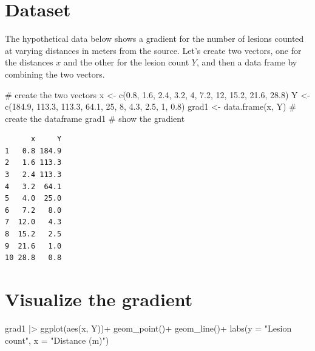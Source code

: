 \documentclass[
  letterpaper,
  DIV=11,
  numbers=noendperiod]{scrreprt}
\newenvironment{Shaded}{\begin{snugshade}}{\end{snugshade}}
\newcommand{\AttributeTok}[1]{\textcolor[rgb]{0.40,0.45,0.13}{#1}}
\newcommand{\CommentTok}[1]{\textcolor[rgb]{0.37,0.37,0.37}{#1}}
\newcommand{\DecValTok}[1]{\textcolor[rgb]{0.68,0.00,0.00}{#1}}
\newcommand{\FloatTok}[1]{\textcolor[rgb]{0.68,0.00,0.00}{#1}}
\newcommand{\FunctionTok}[1]{\textcolor[rgb]{0.28,0.35,0.67}{#1}}
\newcommand{\NormalTok}[1]{\textcolor[rgb]{0.00,0.23,0.31}{#1}}
\newcommand{\OtherTok}[1]{\textcolor[rgb]{0.00,0.23,0.31}{#1}}
\newcommand{\SpecialCharTok}[1]{\textcolor[rgb]{0.37,0.37,0.37}{#1}}
\newcommand{\StringTok}[1]{\textcolor[rgb]{0.13,0.47,0.30}{#1}}
\begin{document}
\hypertarget{dataset}{%
\section{Dataset}\label{dataset}}

The hypothetical data below shows a gradient for the number of lesions
counted at varying distances in meters from the source. Let's create two
vectors, one for the distances \(x\) and the other for the lesion count
\(Y\), and then a data frame by combining the two vectors.

\begin{Shaded}
\begin{Highlighting}[]
\CommentTok{\# create the two vectors}
\NormalTok{x }\OtherTok{\textless{}{-}} \FunctionTok{c}\NormalTok{(}\FloatTok{0.8}\NormalTok{, }\FloatTok{1.6}\NormalTok{, }\FloatTok{2.4}\NormalTok{, }\FloatTok{3.2}\NormalTok{, }\DecValTok{4}\NormalTok{, }\FloatTok{7.2}\NormalTok{, }\DecValTok{12}\NormalTok{, }\FloatTok{15.2}\NormalTok{, }\FloatTok{21.6}\NormalTok{, }\FloatTok{28.8}\NormalTok{)}
\NormalTok{Y }\OtherTok{\textless{}{-}} \FunctionTok{c}\NormalTok{(}\FloatTok{184.9}\NormalTok{, }\FloatTok{113.3}\NormalTok{, }\FloatTok{113.3}\NormalTok{, }\FloatTok{64.1}\NormalTok{, }\DecValTok{25}\NormalTok{, }\DecValTok{8}\NormalTok{, }\FloatTok{4.3}\NormalTok{, }\FloatTok{2.5}\NormalTok{, }\DecValTok{1}\NormalTok{, }\FloatTok{0.8}\NormalTok{)}
\NormalTok{grad1 }\OtherTok{\textless{}{-}} \FunctionTok{data.frame}\NormalTok{(x, Y) }\CommentTok{\# create the dataframe}
\NormalTok{grad1 }\CommentTok{\# show the gradient}
\end{Highlighting}
\end{Shaded}

\begin{verbatim}
      x     Y
1   0.8 184.9
2   1.6 113.3
3   2.4 113.3
4   3.2  64.1
5   4.0  25.0
6   7.2   8.0
7  12.0   4.3
8  15.2   2.5
9  21.6   1.0
10 28.8   0.8
\end{verbatim}

\hypertarget{visualize-the-gradient}{%
\section{Visualize the gradient}\label{visualize-the-gradient}}

\begin{Shaded}
\begin{Highlighting}[]
\NormalTok{grad1 }\SpecialCharTok{|\textgreater{}} 
  \FunctionTok{ggplot}\NormalTok{(}\FunctionTok{aes}\NormalTok{(x, Y))}\SpecialCharTok{+}
  \FunctionTok{geom\_point}\NormalTok{()}\SpecialCharTok{+}
  \FunctionTok{geom\_line}\NormalTok{()}\SpecialCharTok{+}
  \FunctionTok{labs}\NormalTok{(}\AttributeTok{y =} \StringTok{"Lesion count"}\NormalTok{,}
       \AttributeTok{x =} \StringTok{"Distance (m)"}\NormalTok{)}
\end{Highlighting}
\end{Shaded}
\end{document}
